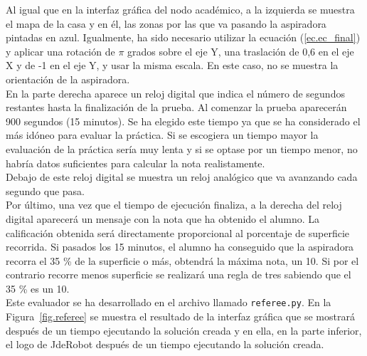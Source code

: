 Al igual que en la interfaz gráfica del nodo académico, a la izquierda se muestra el mapa de la casa y en él, las zonas por las que va pasando la aspiradora pintadas en azul. Igualmente, ha sido necesario utilizar la ecuación (\ref{ec.ec_final}) y aplicar una rotación de \(\pi\) grados sobre el eje Y, una traslación de 0,6 en el eje X y de -1 en el eje Y, y usar la misma escala. En este caso, no se muestra la orientación de la aspiradora.\\

En la parte derecha aparece un reloj digital que indica el número de segundos restantes hasta la finalización de la prueba. Al comenzar la prueba aparecerán 900 segundos (15 minutos). Se ha elegido este tiempo ya que se ha considerado el más idóneo para evaluar la práctica. Si se escogiera un tiempo mayor la evaluación de la práctica sería muy lenta y si se optase por un tiempo menor, no habría datos suficientes para calcular la nota realistamente. \\

Debajo de este reloj digital se muestra un reloj analógico que va avanzando cada segundo que pasa. \\

Por último, una vez que el tiempo de ejecución finaliza, a la derecha del reloj digital aparecerá un mensaje con la nota que ha obtenido el alumno. La calificación obtenida será directamente proporcional al porcentaje de superficie recorrida. Si pasados los 15 minutos, el alumno ha conseguido que la aspiradora recorra el 35 \% de la superficie o más, obtendrá la máxima nota, un 10. Si por el contrario recorre menos superficie se realizará una regla de tres sabiendo que el 35 \% es un 10.\\

Este evaluador se ha desarrollado en el archivo llamado \texttt{referee.py}. En la Figura~\ref{fig.referee} se muestra el resultado de la interfaz gráfica que se mostrará después de un tiempo ejecutando la solución creada y en ella, en la parte inferior, el logo de JdeRobot después de un tiempo ejecutando la solución creada.

